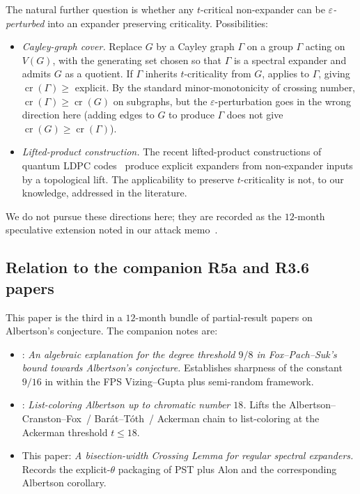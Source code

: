 \documentclass[11pt,a4paper]{article}
\theoremstyle{definition}
\DeclareMathOperator{\crN}{cr}
\newcommand{\eps}{\varepsilon}
\begin{document}
The natural further question is whether any $t$-critical
non-expander can be \emph{$\eps$-perturbed} into an expander
preserving criticality. Possibilities:
\begin{itemize}
\item \emph{Cayley-graph cover.} Replace $G$ by a Cayley graph
  $\Gamma$ on a group $\Gamma$ acting on $V(G)$, with the
  generating set chosen so that $\Gamma$ is a spectral expander
  and admits $G$ as a quotient. If $\Gamma$ inherits
  $t$-criticality from $G$,  applies to $\Gamma$,
  giving $\crN(\Gamma) \ge $ explicit. By
  the standard minor-monotonicity of crossing number,
  $\crN(\Gamma) \ge \crN(G)$ on subgraphs, but the
  $\eps$-perturbation goes in the wrong direction here (adding
  edges to $G$ to produce $\Gamma$ does not give $\crN(G) \ge
  \crN(\Gamma)$).
\item \emph{Lifted-product construction.} The recent lifted-product
  constructions of quantum LDPC codes~\cite{PanteleevKalachev}
  produce explicit expanders from non-expander
  inputs by a topological lift. The applicability to
  preserve $t$-criticality is not, to our knowledge, addressed
  in the literature.
\end{itemize}
We do not pursue these directions here; they are recorded as the
$12$-month speculative extension noted in our
attack memo~\cite{D13}.

\subsection{Relation to the companion R5a and R3.6 papers}\label{ssec:bundle}

This paper is the third in a $12$-month bundle of partial-result
papers on Albertson's conjecture. The companion notes are:

\begin{itemize}
\item \cite{D8}: \emph{An algebraic explanation for the degree
  threshold $9/8$ in Fox--Pach--Suk's bound towards Albertson's
  conjecture.} Establishes sharpness of the constant $9/16$ in
  \cite[Lemma 2.3]{FPS} within the FPS Vizing--Gupta plus semi-random
  framework.
\item \cite{D15}: \emph{List-coloring Albertson up to chromatic
  number $18$.} Lifts the Albertson--Cranston--Fox~/
  Bar\'at--T\'oth~/ Ackerman chain to list-coloring at the
  Ackerman threshold $t \le 18$.
\item This paper: \emph{A bisection-width Crossing Lemma for
  regular spectral expanders.} Records the explicit-$\theta$
  packaging of PST plus Alon and the corresponding Albertson
  corollary.
\end{itemize}
\end{document}
